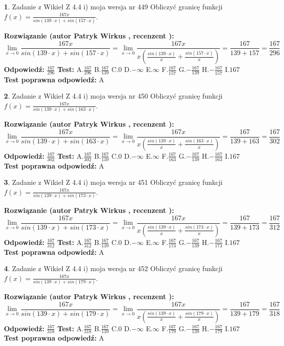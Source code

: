\documentclass[12pt, a4paper]{article}
\theoremstyle{definition} %
\newtheorem{zad}{}
\newcommand{\zadStart}[1]{\begin{zad}#1\newline}
\newcommand{\zadStop}{\end{zad}}
\newcommand{\rozwStart}[2]{\noindent \textbf{Rozwiązanie (autor #1 , recenzent #2): }\newline}
\newcommand{\rozwStop}{\newline}
\newcommand{\odpStart}{\noindent \textbf{Odpowiedź:}\newline}
\newcommand{\odpStop}{\newline}
\newcommand{\testStart}{\noindent \textbf{Test:}\newline}
\newcommand{\testStop}{\newline}
\newcommand{\kluczStart}{\noindent \textbf{Test poprawna odpowiedź:}\newline}
\newcommand{\kluczStop}{\newline}
\begin{document}
\zadStart{Zadanie z Wikieł Z 4.4 i) moja wersja nr 449}
Obliczyć granicę funkcji $f(x)=\frac{167x}{sin(139\cdot x) +sin(157\cdot x)}$.
\zadStop
\rozwStart{Patryk Wirkus}{}
$$\lim\limits_{x\to 0}\frac{167x}{sin(139\cdot x) +sin(157\cdot x)}=\lim\limits_{x\to 0}\frac{167x}{x(\frac{sin(139\cdot x)}{x}+\frac{sin(157\cdot x)}{x})}=\frac{167}{139+157} = \frac{167}{296}$$
\rozwStop
\odpStart
$\frac{167}{296}$
\odpStop
\testStart
A.$\frac{167}{296}$
B.$\frac{167}{139}$
C.$0$
D.$-\infty$
E.$\infty$
F.$\frac{167}{157}$
G.$-\frac{167}{139}$
H.$-\frac{167}{157}$
I.$167$
\testStop
\kluczStart
A
\kluczStop



\zadStart{Zadanie z Wikieł Z 4.4 i) moja wersja nr 450}
Obliczyć granicę funkcji $f(x)=\frac{167x}{sin(139\cdot x) +sin(163\cdot x)}$.
\zadStop
\rozwStart{Patryk Wirkus}{}
$$\lim\limits_{x\to 0}\frac{167x}{sin(139\cdot x) +sin(163\cdot x)}=\lim\limits_{x\to 0}\frac{167x}{x(\frac{sin(139\cdot x)}{x}+\frac{sin(163\cdot x)}{x})}=\frac{167}{139+163} = \frac{167}{302}$$
\rozwStop
\odpStart
$\frac{167}{302}$
\odpStop
\testStart
A.$\frac{167}{302}$
B.$\frac{167}{139}$
C.$0$
D.$-\infty$
E.$\infty$
F.$\frac{167}{163}$
G.$-\frac{167}{139}$
H.$-\frac{167}{163}$
I.$167$
\testStop
\kluczStart
A
\kluczStop



\zadStart{Zadanie z Wikieł Z 4.4 i) moja wersja nr 451}
Obliczyć granicę funkcji $f(x)=\frac{167x}{sin(139\cdot x) +sin(173\cdot x)}$.
\zadStop
\rozwStart{Patryk Wirkus}{}
$$\lim\limits_{x\to 0}\frac{167x}{sin(139\cdot x) +sin(173\cdot x)}=\lim\limits_{x\to 0}\frac{167x}{x(\frac{sin(139\cdot x)}{x}+\frac{sin(173\cdot x)}{x})}=\frac{167}{139+173} = \frac{167}{312}$$
\rozwStop
\odpStart
$\frac{167}{312}$
\odpStop
\testStart
A.$\frac{167}{312}$
B.$\frac{167}{139}$
C.$0$
D.$-\infty$
E.$\infty$
F.$\frac{167}{173}$
G.$-\frac{167}{139}$
H.$-\frac{167}{173}$
I.$167$
\testStop
\kluczStart
A
\kluczStop



\zadStart{Zadanie z Wikieł Z 4.4 i) moja wersja nr 452}
Obliczyć granicę funkcji $f(x)=\frac{167x}{sin(139\cdot x) +sin(179\cdot x)}$.
\zadStop
\rozwStart{Patryk Wirkus}{}
$$\lim\limits_{x\to 0}\frac{167x}{sin(139\cdot x) +sin(179\cdot x)}=\lim\limits_{x\to 0}\frac{167x}{x(\frac{sin(139\cdot x)}{x}+\frac{sin(179\cdot x)}{x})}=\frac{167}{139+179} = \frac{167}{318}$$
\rozwStop
\odpStart
$\frac{167}{318}$
\odpStop
\testStart
A.$\frac{167}{318}$
B.$\frac{167}{139}$
C.$0$
D.$-\infty$
E.$\infty$
F.$\frac{167}{179}$
G.$-\frac{167}{139}$
H.$-\frac{167}{179}$
I.$167$
\testStop
\kluczStart
A
\kluczStop
\end{document}
